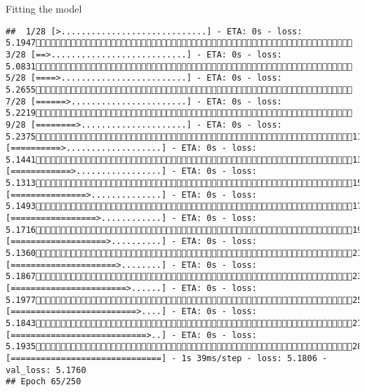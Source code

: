 \documentclass[
  ignorenonframetext,
]{beamer}
\begin{document}
\begin{frame}[fragile]{Fitting the model}
\begin{verbatim}
##  1/28 [>.............................] - ETA: 0s - loss: 5.1947 3/28 [==>...........................] - ETA: 0s - loss: 5.0831 5/28 [====>.........................] - ETA: 0s - loss: 5.2655 7/28 [======>.......................] - ETA: 0s - loss: 5.2219 9/28 [========>.....................] - ETA: 0s - loss: 5.237511/28 [==========>...................] - ETA: 0s - loss: 5.144113/28 [============>.................] - ETA: 0s - loss: 5.131315/28 [===============>..............] - ETA: 0s - loss: 5.149317/28 [=================>............] - ETA: 0s - loss: 5.171619/28 [===================>..........] - ETA: 0s - loss: 5.136021/28 [=====================>........] - ETA: 0s - loss: 5.186723/28 [=======================>......] - ETA: 0s - loss: 5.197725/28 [=========================>....] - ETA: 0s - loss: 5.184327/28 [===========================>..] - ETA: 0s - loss: 5.193528/28 [==============================] - 1s 39ms/step - loss: 5.1806 - val_loss: 5.1760
## Epoch 65/250

\end{verbatim}
\end{frame}
\end{document}
